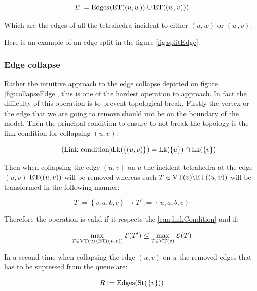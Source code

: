 \documentclass[11pt]{article}
\begin{document}
$$E := \mathrm{Edges}(\mathrm{ET}((u,w))\cup\mathrm{ET}((w,v)))$$

Which are the edges of all the tetrahedra incident to either $(u,w)$ or $(w,v)$.


Here is an example of an edge split in the figure \ref{fig:splitEdge}.



\subsubsection{Edge collapse}



Rather the intuitive approach to the edge collapse depicted on figure \ref{fig:collapseEdge}, this is one of the hardest operation to approach. In fact the difficulty of this operation is to prevent topological break. Firstly the vertex or the edge that we are
going to remove should not be on the boundary of the model. Then the principal condition to ensure to not
break the topology is the link condition for collapsing $(u,v)$:

\begin{equation}
	\tag{Link condition}
	\mathrm{Lk}(\left\{(u,v)\right\}) = \mathrm{Lk}(\left\{u\right\}) \cap \mathrm{Lk}(\left\{v\right\})
	\label{eqn:linkCondition}
\end{equation}

Then when collapsing the edge $(u,v)$ on $u$ the incident tetrahedra at the edge $(u,v)$ $\mathrm{ET}((u,v))$ will be
removed whereas each $T\in\mathrm{VT}(v)\backslash\mathrm{ET}((u,v))$ will be transformed in the following manner:

$$T:=\left\{v,a,b,c\right\}\longrightarrow T':=\left\{u,a,b,c\right\}$$

Therefore the operation is valid if it respects the \ref{eqn:linkCondition} and if:

$$\underset{T\in\mathrm{VT}(v)\backslash\mathrm{ET}((u,v))}{\max}\;\mathcal{E}(T')\leq\underset{T\in\mathrm{VT}(v)}{\max}\;\mathcal{E}(T)$$

In a second time when collapsing the edge $(u,v)$ on $u$ the removed edges that has to be supressed from the
queue are:

$$R := \mathrm{Edges}(\mathrm{St}(\left\{v\right\}))$$
\end{document}
